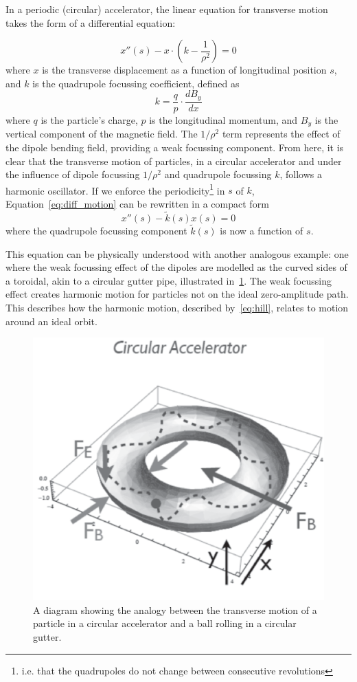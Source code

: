 \documentclass[11pt]{report}
\begin{document}
In a periodic (circular) accelerator, the linear equation for transverse motion takes the form of a differential equation:

\begin{equation}
  x''(s)-x\cdot\left(k-\frac{1}{\rho^2}\right)=0
  \label{eq:diff_motion}
\end{equation} 
where $x$ is the transverse displacement as a function of longitudinal position $s$, and $k$ is the quadrupole focussing coefficient, defined as
\begin{equation}
  k=\frac{q}{p}\cdot\frac{dB_y}{dx}
  \label{eq:quadrupole}
\end{equation} where $q$ is the particle's charge, $p$ is the longitudinal momentum, and $B_y$ is the vertical component of the magnetic field. The $1/\rho^2$ term represents the effect of the dipole bending field, providing a weak focussing component.
From here, it is clear that the transverse motion of particles, in a circular accelerator and under the influence of dipole focussing $1/\rho^2$ and quadrupole focussing $k$, follows a harmonic oscillator. If we enforce the periodicity\footnote{i.e. that the quadrupoles do not change between consecutive revolutions} in $s$ of $k$, Equation~\ref{eq:diff_motion} can be rewritten in a compact form
\begin{equation}
  x''(s)-\tilde{k}(s)x(s)=0
  \label{eq:hill}
\end{equation} where the quadrupole focussing component $\tilde{k}(s)$ is now a function of $s$. 

This equation can be physically understood with another analogous example: one where the weak focussing effect of the dipoles are modelled as the curved sides of a toroidal, akin to a circular gutter pipe, illustrated in~\ref{fig:guttering}. The weak focussing effect creates harmonic motion for particles not on the ideal zero-amplitude path. This describes how the harmonic motion, described by~\autoref{eq:hill}, relates to motion around an ideal orbit.

\begin{figure}[h]
  \centering
  \includegraphics*[width=0.6\linewidth]{guttering}
  \caption{A diagram showing the analogy between the transverse motion of a particle in a circular accelerator and a ball rolling in a circular gutter.}\label{fig:guttering}
\end{figure}
\end{document}
